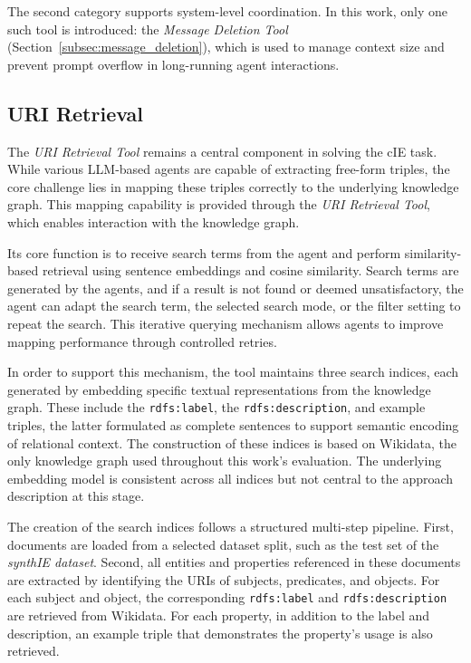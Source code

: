 \documentclass[a4paper,oneside,bibliography=totoc]{scrbook}
\begin{document}
The second category supports system-level coordination. In this work, only one such tool is introduced: the \textit{Message Deletion Tool} (Section~\ref{subsec:message_deletion}), which is used to manage context size and prevent prompt overflow in long-running agent interactions.

\subsection{URI Retrieval}
\label{subsec:uri_retrieval}

The \textit{URI Retrieval Tool} remains a central component in solving the \ac{cIE} task. While various \ac{LLM}-based agents are capable of extracting free-form triples, the core challenge lies in mapping these triples correctly to the underlying knowledge graph. This mapping capability is provided through the \textit{URI Retrieval Tool}, which enables interaction with the knowledge graph.

Its core function is to receive search terms from the agent and perform similarity-based retrieval using sentence embeddings and cosine similarity. Search terms are generated by the agents, and if a result is not found or deemed unsatisfactory, the agent can adapt the search term, the selected search mode, or the filter setting to repeat the search.
This iterative querying mechanism allows agents to improve mapping performance through controlled retries.

In order to support this mechanism, the tool maintains three search indices, each generated by embedding specific textual representations from the knowledge graph. These include the \texttt{rdfs:label}, the \texttt{rdfs:description}, and example triples, the latter formulated as complete sentences to support semantic encoding of relational context. The construction of these indices is based on Wikidata, the only knowledge graph used throughout this work’s evaluation. The underlying embedding model is consistent across all indices but not central to the approach description at this stage.

The creation of the search indices follows a structured multi-step pipeline. First, documents are loaded from a selected dataset split, such as the test set of the \textit{synthIE dataset}. Second, all entities and properties referenced in these documents are extracted by identifying the URIs of subjects, predicates, and objects. For each subject and object, the corresponding \texttt{rdfs:label} and \texttt{rdfs:description} are retrieved from Wikidata. For each property, in addition to the label and description, an example triple that demonstrates the property’s usage is also retrieved.
\end{document}
